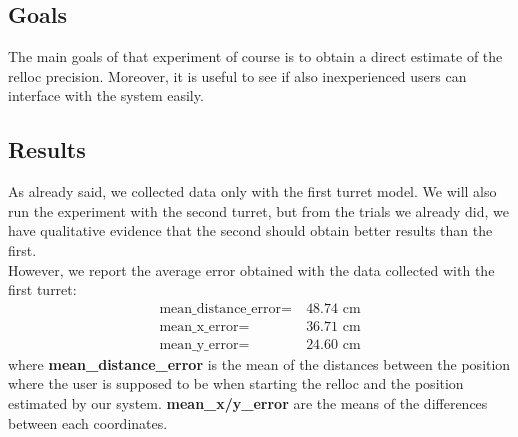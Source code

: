\subsection{Goals}
The main goals of that experiment of course is to obtain a direct estimate of the \ac{relloc} precision. Moreover, it is useful to see if also inexperienced users can interface with the system easily.

\subsection{Results}
As already said, we collected data only with the first turret model. We will also run the experiment with the second turret, but from the trials we already did, we have qualitative evidence that the second should obtain better results than the first. \\
However, we report the average error obtained with the data collected with the first turret:
\begin{align}
    \text{mean\_distance\_error} =&\ 48.74\text{ cm} \nonumber\\
    \text{mean\_x\_error} =&\ 36.71\text{ cm}\nonumber\\
    \text{mean\_y\_error} =&\ 24.60\text{ cm}\nonumber
\end{align}
where \textbf{mean\_distance\_error} is the mean of the distances between the position where the user is supposed to be when starting the \ac{relloc} and the position estimated by our system. \textbf{mean\_x/y\_error} are the means of the differences between each coordinates.

